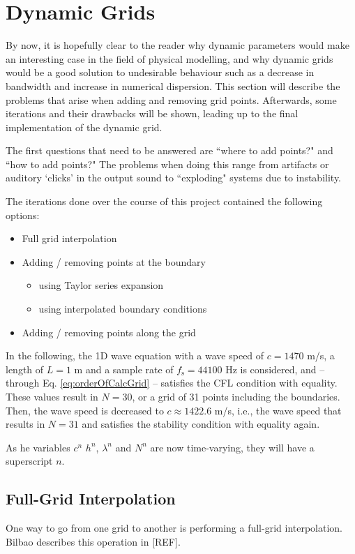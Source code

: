 \documentclass[dvipsnames, preprint]{JASA}
\begin{document}
\section{Dynamic Grids}
By now, it is hopefully clear to the reader why dynamic parameters would make an interesting case in the field of physical modelling, and why dynamic grids would be a good solution to undesirable behaviour such as a decrease in bandwidth and increase in numerical dispersion. This section will describe the problems that arise when adding and removing grid points. Afterwards, some iterations and their drawbacks will be shown, leading up to the final implementation of the dynamic grid. 

The first questions that need to be answered are ``where to add points?" and ``how to add points?" The problems when doing this range from artifacts or auditory `clicks' in the output sound to ``exploding" systems due to instability.


The iterations done over the course of this project contained the following options:
\begin{itemize}
    \item Full grid interpolation
    \item Adding / removing points at the boundary
    \begin{itemize}
        \item using Taylor series expansion
        \item using interpolated boundary conditions
    \end{itemize}
    \item Adding / removing points along the grid
\end{itemize}
In the following, the 1D wave equation with a wave speed of $c = 1470$ m/s, a length of $L = 1$ m and a sample rate of $f_\text{s} = 44100$ Hz is considered, and -- through Eq. \eqref{eq:orderOfCalcGrid} -- satisfies the CFL condition with equality. These values result in $N = 30$, or a grid of 31 points including the boundaries. Then, the wave speed is decreased to $c \approx 1422.6$ m/s, i.e., the wave speed that results in $N=31$ and satisfies the stability condition with equality again. 

As he variables $c^n$ $h^n$, $\lambda^n$ and $N^n$ are now time-varying, they will have a superscript $n$.

\subsection{Full-Grid Interpolation}
One way to go from one grid to another is performing a full-grid interpolation. Bilbao describes this operation in [REF]. 
\end{document}
